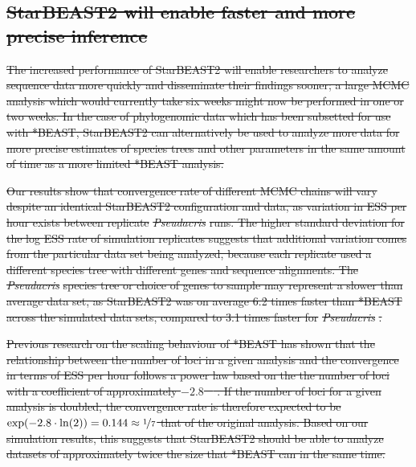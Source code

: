 \documentclass[12pt]{article}
\providecommand{\DIFdeltex}[1]{{\protect\color{red}\sout{#1}}}                      %
\providecommand{\DIFdel}[1]{\texorpdfstring{\DIFdeltex{#1}}{}} %
\begin{document}
\subsection{\DIFdel{StarBEAST2 will enable faster and more precise inference}}
\addtocounter{subsection}{-1}%

\DIFdel{The increased performance of StarBEAST2 will enable researchers to analyze
sequence data more quickly and disseminate their findings sooner; a large MCMC
analysis which would currently take six weeks might now be performed in one or two
weeks. In the case of phylogenomic data which has been subsetted for use with
*BEAST, StarBEAST2 can alternatively be used to analyze more data for more
precise estimates of species trees and other parameters in the same amount of
time as a more limited *BEAST analysis.
}%

\DIFdel{Our results show that convergence rate of different MCMC chains will vary
despite an identical StarBEAST2 configuration and data, as variation in ESS per
hour exists between replicate }\textit{\DIFdel{Pseudacris}} %
\DIFdel{runs. The
higher standard deviation for the log ESS rate of simulation replicates suggests
that additional variation comes from the particular data set being analyzed,
because each replicate used a different species tree with different genes and
sequence alignments. The }\textit{\DIFdel{Pseudacris}} %
\DIFdel{species tree or choice of genes to
sample may
represent a slower than average data set, as StarBEAST2 was on average 6.2 times
faster than *BEAST across the simulated data sets, compared to 3.1 times faster
for }\textit{\DIFdel{Pseudacris}}%
\DIFdel{.
}%

\DIFdel{Previous research on the scaling behaviour of *BEAST has shown that the
relationship between the number of loci in a given analysis and the convergence
in terms of ESS per hour follows a power law based on the
the number of loci with a coefficient of approximately $-2.8$ \mbox{%
\citep{Ogilvie01052016}}%
. If the number of loci for a
given analysis is doubled, the convergence rate is therefore
expected to be $\exp(-2.8 \cdot \ln(2)) = 0.144 \approx \nicefrac{1}{7}$ that
of the original analysis. Based on our simulation results, this suggests that
StarBEAST2 should be able to analyze datasets of approximately twice the size
that *BEAST can in the same time.
}%
\end{document}
